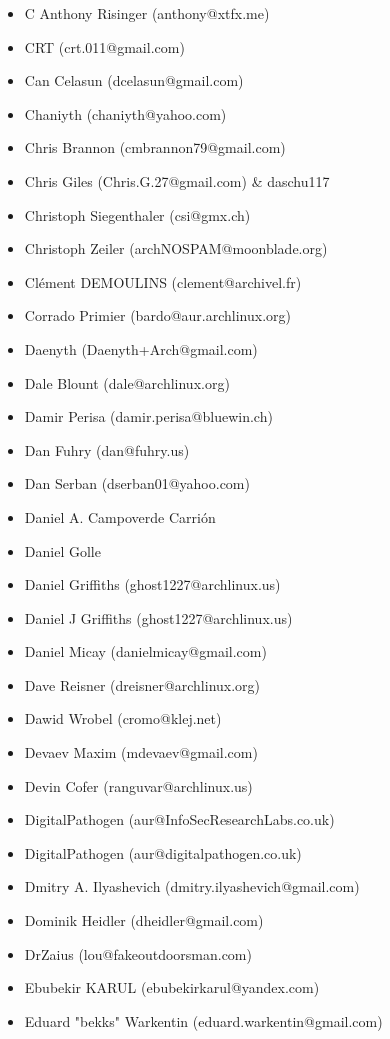 \begin{itemize}
\item  C Anthony Risinger (anthony@xtfx.me)
\item  CRT (crt.011@gmail.com)
\item  Can Celasun (dcelasun@gmail.com)
\item  Chaniyth (chaniyth@yahoo.com)
\item  Chris Brannon (cmbrannon79@gmail.com)
\item  Chris Giles (Chris.G.27@gmail.com) \& daschu117
\item  Christoph Siegenthaler (csi@gmx.ch)
\item  Christoph Zeiler (archNOSPAM@moonblade.org)
\item  Clément DEMOULINS (clement@archivel.fr)
\item  Corrado Primier (bardo@aur.archlinux.org)
\item  Daenyth (Daenyth+Arch@gmail.com)
\item  Dale Blount (dale@archlinux.org)
\item  Damir Perisa (damir.perisa@bluewin.ch)
\item  Dan Fuhry (dan@fuhry.us)
\item  Dan Serban (dserban01@yahoo.com)
\item  Daniel A. Campoverde Carrión
\item  Daniel Golle
\item  Daniel Griffiths (ghost1227@archlinux.us)
\item  Daniel J Griffiths (ghost1227@archlinux.us)
\item  Daniel Micay (danielmicay@gmail.com)
\item  Dave Reisner (dreisner@archlinux.org)
\item  Dawid Wrobel (cromo@klej.net)
\item  Devaev Maxim (mdevaev@gmail.com)
\item  Devin Cofer (ranguvar@archlinux.us)
\item  DigitalPathogen (aur@InfoSecResearchLabs.co.uk)
\item  DigitalPathogen (aur@digitalpathogen.co.uk)
\item  Dmitry A. Ilyashevich (dmitry.ilyashevich@gmail.com)
\item  Dominik Heidler (dheidler@gmail.com)
\item  DrZaius (lou@fakeoutdoorsman.com)
\item  Ebubekir KARUL (ebubekirkarul@yandex.com)
\item  Eduard "bekks" Warkentin (eduard.warkentin@gmail.com)

\end{itemize}
